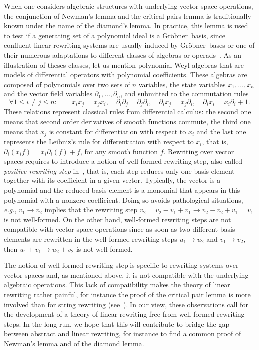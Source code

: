 \documentclass[11pt]{article}
\theoremstyle{definition}
\newcommand\eg{\emph{e.g.}}
\newcommand\G{Gröbner}
\begin{document}
When one considers algebraic structures with underlying vector space
operations, the conjunction of Newman's lemma and the critical pairs
lemma is traditionally known under the name of the diamond's lemma. In
practice, this lemma is used to test if a generating set of a polynomial
ideal is a \G\ basis, since confluent linear rewriting systems are
usually induced by \G\ bases or one of their numerous adaptations to
different classes of algebras or operads~\cite{MR506890, MR2202562,
  MR2667136, MR1044911, MR1299371}. As an illustration of theses classes,
let us mention polynomial Weyl algebras that are models of differential
operators with polynomial coefficients. These algebras are composed of
polynomials over two sets of $n$ variables, the state variables
$x_1,\ldots,x_n$ and the vector field variables
$\partial_1,\ldots,\partial_n$, and submitted to the commutation rules
\[ \forall 1\leq i\neq j\leq n: \qquad x_ix_j=x_jx_i,
\quad \partial_i\partial_j=\partial_j\partial_i, \quad \partial_ix_j=
x_j\partial_i, \quad\partial_ix_i=x_i\partial_i+1. \]
These relations represent classical rules from differential calculus: the
second one means that second order derivatives of smooth functions
commute, the third one means that $x_j$ is constant for differentiation
with respect to $x_i$ and the last one represents the Leibniz's rule for
differentiation with respect to $x_i$, that is,
$\partial_i(x_if)=x_i\partial_i(f)+f$, for any smooth function $f$.
Rewriting over vector spaces requires to introduce a notion of
well-formed rewriting step, also called {\em positive rewriting step}
in~\cite{GuiraudHoffbeckMalbos19}, that is, each step reduces only one
basis element together with its coefficient in a given vector. Typically,
the vector is a polynomial and the reduced basis element is a monomial
that appears in this polynomial with a nonzero coefficient. Doing so
avoids pathological situations, \eg, $v_1\to v_2$ implies that the
rewriting step $v_2=v_2-v_1+v_1\to v_2-v_2+v_1=v_1$ is not well-formed.
On the other hand, well-formed rewriting steps are not compatible with
vector space operations since as soon as two different basis elements are
rewritten in the well-formed rewriting steps $u_1\to u_2$ and
$v_1\to v_2$, then $u_1+v_1\to u_2+v_2$ is not well-formed.
\medskip

The notion of well-formed rewriting step is specific to rewriting systems over
vector spaces and, as mentioned above, it is not compatible with the underlying
algebraic operations. This lack of compatibility makes the theory of linear
rewriting rather painful, for instance the proof of the critical pair lemma is
more involved than for string rewriting (see~\cite[Theorem
4.2.1]{GuiraudHoffbeckMalbos19}). In our view, these observations call for the
development of a theory of linear rewriting free from well-formed rewriting
steps. In the long run, we hope that this will contribute to bridge the gap
between abstract and linear rewriting, for instance to find a common proof of
Newman's lemma and of the diamond lemma.
\end{document}
